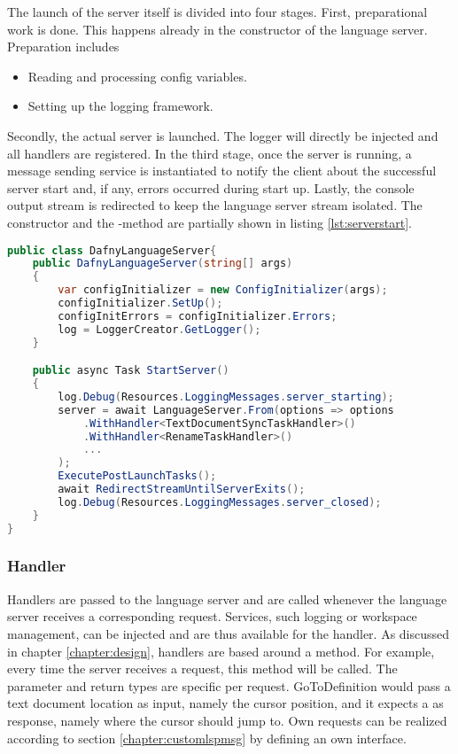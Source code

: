 The launch of the server itself is divided into four stages.
First, preparational work is done.
This happens already in the constructor of the language server.
Preparation includes
\begin{itemize}
    \item Reading and processing config variables.
    \item Setting up the logging framework.
\end{itemize}
Secondly, the actual server is launched.
The logger will directly be injected and all handlers are registered.
In the third stage, once the server is running, a message sending service is instantiated to notify the client about the successful server start and, if any, errors occurred during start up.
Lastly, the console output stream is redirected to keep the language server stream isolated.
The constructor and the -method are partially shown in listing \ref{lst:serverstart}.

\begin{lstlisting}[language=csharp, caption={Starting the Language Server}, captionpos=b, label={lst:serverstart}]
public class DafnyLanguageServer{
    public DafnyLanguageServer(string[] args)
    {
        var configInitializer = new ConfigInitializer(args);
        configInitializer.SetUp();
        configInitErrors = configInitializer.Errors;
        log = LoggerCreator.GetLogger();
    }

    public async Task StartServer()
    {
        log.Debug(Resources.LoggingMessages.server_starting);
        server = await LanguageServer.From(options => options
            .WithHandler<TextDocumentSyncTaskHandler>()
            .WithHandler<RenameTaskHandler>()
            ...
        );
        ExecutePostLaunchTasks();
        await RedirectStreamUntilServerExits();
        log.Debug(Resources.LoggingMessages.server_closed);
    }
}
\end{lstlisting}

\subsubsection{Handler}
Handlers are passed to the language server and are called whenever the language server receives a corresponding request.
Services, such logging or workspace management, can be injected and are thus available for the handler.
As discussed in chapter \ref{chapter:design}, handlers are based around a  method.
For example, every time the server receives a  request, this  method will be called.
The parameter and return types are specific per request.
GoToDefinition would pass a text document location as input, namely the cursor position, and it expects a  as response,
namely where the cursor should jump to.
Own requests can be realized according to section \ref{chapter:customlspmsg} by defining an own interface.\\

